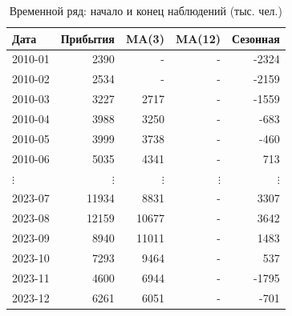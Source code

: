 \begin{table}[h!]
\centering
\caption{Временной ряд: начало и конец наблюдений (тыс. чел.)}
\label{tab:short}
\begin{tabular}{lrrrr}
\toprule
Дата & Прибытия & MA(3) & MA(12) & Сезонная \\
\midrule
2010-01 & 2390 & - & - & -2324 \\
2010-02 & 2534 & - & - & -2159 \\
2010-03 & 3227 & 2717 & - & -1559 \\
2010-04 & 3988 & 3250 & - & -683 \\
2010-05 & 3999 & 3738 & - & -460 \\
2010-06 & 5035 & 4341 & - & 713 \\
$\vdots$ & $\vdots$ & $\vdots$ & $\vdots$ & $\vdots$ \\
2023-07 & 11934 & 8831 & - & 3307 \\
2023-08 & 12159 & 10677 & - & 3642 \\
2023-09 & 8940 & 11011 & - & 1483 \\
2023-10 & 7293 & 9464 & - & 537 \\
2023-11 & 4600 & 6944 & - & -1795 \\
2023-12 & 6261 & 6051 & - & -701 \\
\bottomrule
\end{tabular}
\end{table}
